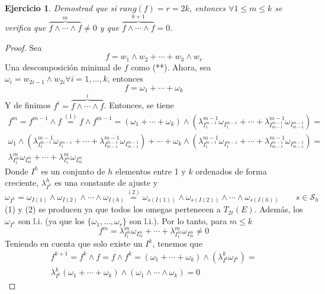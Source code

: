 \documentclass[12pt]{article}
\theoremstyle{break}
\newtheorem{ej}{Ejercicio}
\newtheorem*{proof}{Demostración}
\begin{document}
\begin{ej}
	Demostrad que si $rang(f)=r=2k$, entonces $\forall 1 \leq m \leq k$ se verifica que
	$\overbrace{f \wedge \cdots \wedge f}^{m} \neq 0$ y que
	$\overbrace{f \wedge \cdots \wedge f}^{k+1}= 0$.
\end{ej}
\begin{proof}
	Sea
	\[
		f = w_1 \wedge w_2 + \cdots + w_3 \wedge w_r
	\]
	Una descomposición minimal de $f$ como (**). Ahora, sea $\omega_i = w_{2i-1}\wedge
	w_{2i} \forall i=1,\dots,k$, entonces
	\[
		f = \omega_1 + \cdots + \omega_k
	\]
	Y de finimos $f^i = \overbrace{f \wedge \cdots \wedge f}^{i}$. Entonces, se tiene
	\begin{gather*}
		f^m = f^{m-1} \wedge f \stackrel{(1)}{=} f \wedge f^{m-1} =
		\left( \omega_1 + \cdots + \omega_k \right) \wedge
		\left( \lambda^{m-1}_{I_1^{m-1}} \omega_{I_1^{m-1}} + \cdots +
		\lambda^{m-1}_{I_{m-1}^{m-1}} \omega_{I_{m-1}^{m-1}} \right)=\\
		\omega_1 \wedge \left( \lambda^{m-1}_{I_1^{m-1}} \omega_{I_1^{m-1}} + \cdots +
		\lambda^{m-1}_{I_{m-1}^{m-1}} \omega_{I_{m-1}^{m-1}} \right) + \cdots +
		\omega_k \wedge \left( \lambda^{m-1}_{I_1^{m-1}} \omega_{I_1^{m-1}} + \cdots +
		\lambda^{m-1}_{I_{m-1}^{m-1}} \omega_{I_{m-1}^{m-1}} \right) =\\
		\lambda^m_{I_1^m} \omega_{I_m^m} + \cdots + \lambda^m_{I_1^m} \omega_{I_m^m}
	\end{gather*}
	Donde $I^h$ es un conjunto de $h$ elementos entre 1 y $k$ ordenados de forma creciente,
	$\lambda_{I^h}^h$ es una constante de ajuste y
	\[
		\omega_{I^h} = \omega_{I(1)} \wedge \omega_{I(2)} \wedge \cdots \wedge \omega_{I(h)} \stackrel{(2)}{=} \omega_{s(I(1))} \wedge \omega_{s(I(2))} \wedge \cdots \wedge \omega_{s(I(h))} \qquad s \in \mathcal{S}_h
	\]
	(1) y (2) se producen ya que todos los omegas pertenecen a $T_{2t}(E)$. Además, los
	$\omega_{I^h}$ son l.i. (ya que los $\{\omega_1,\dots,\omega_r\}$ son l.i.). Por lo
	tanto, para $m \leq k$
	\[
		f^m = \lambda^m_{I_1^m} \omega_{I_m^m} + \cdots + \lambda^m_{I_1^m} \omega_{I_m^m}
		\neq 0
	\]
	Teniendo en cuenta que solo existe un $I^k$, tenemos que  
	\begin{gather*}
		f^{k+1} = f^k \wedge f = f \wedge f^k = \left(\omega_1+\cdots+\omega_k\right) \wedge 
		\left(\lambda^k_{I^k} \omega_{I^k} \right) =\\
		\lambda^k_{I^k} \left(\omega_1+\cdots+\omega_k\right) \wedge \left(
		\omega_1 \wedge \cdots \wedge \omega_k \right) = 0
	\end{gather*}
\end{proof}
\end{document}
